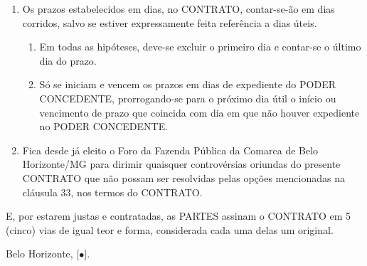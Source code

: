 \documentclass[a4paper,11pt]{report} %
\newcommand{\DataAssinatura}{[$\bullet$]}
\begin{document}
\begin{enumerate}
\item \label{itm:LYQH} Os prazos estabelecidos em dias, no CONTRATO, contar-se-ão em dias corridos, salvo se estiver expressamente feita referência a dias úteis.

\begin{enumerate}[label*=\arabic*.]
\item \label{itm:EH4M} Em todas as hipóteses, deve-se excluir o primeiro dia e contar-se o último dia do prazo.
\item \label{itm:4URU} Só se iniciam e vencem os prazos em dias de expediente do PODER CONCEDENTE, prorrogando-se para o próximo dia útil o início ou vencimento de prazo que coincida com dia em que não houver expediente no PODER CONCEDENTE.
\end{enumerate}

\item \label{itm:N98N} Fica desde já eleito o Foro da Fazenda Pública da Comarca de Belo Horizonte/MG para dirimir quaisquer controvérsias oriundas do presente CONTRATO que não possam ser resolvidas pelas opções mencionadas na cláusula 33, nos termos do CONTRATO.

\end{enumerate}

E, por estarem justas e contratadas, as PARTES assinam o CONTRATO em 5 (cinco) vias de igual teor e forma, considerada cada uma delas um original.

Belo Horizonte, \DataAssinatura.

\end{document}
